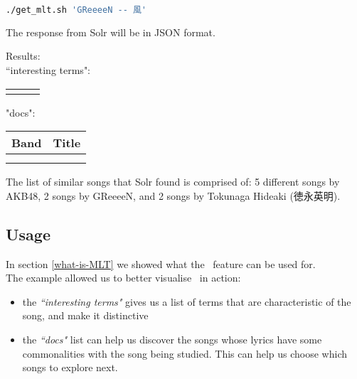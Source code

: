 \begin{lstlisting}[language=sh]
./get_mlt.sh 'GReeeeN -- 風'
\end{lstlisting}


\bigskip



The response from Solr will be in JSON format. \\



\newpage

Results: \\

``interesting terms":
\begin{longtable}{|l l l|}
	\hline
	& & \\
	\endhead
	
	\hline
	\endfoot

	
	& & \\
\end{longtable}


"docs":
\begin{longtable}{|l l|}
	\hline
	\multicolumn{1}{|c}{Band} & \multicolumn{1}{c|}{Title} \\
	\hline
	& \\
	\endhead
	
	\hline
	\endfoot
	
	
	& \\
\end{longtable}

The list of similar songs that Solr found is comprised of: 5 different songs by AKB48, 2 songs by GReeeeN, and 2 songs by Tokunaga Hideaki (徳永英明).

\newpage

\subsection{Usage}

In section \ref{what-is-MLT} we showed what the \MLT\ feature can be used for. \\

The example allowed us to better visualise \MLT\ in action:


\begin{itemize}
	\item the \emph{``interesting terms"} gives us a list of terms that are characteristic of the song, and make it distinctive
	
	\item the \emph{``docs"} list can help us discover the songs whose lyrics have some commonalities with the song being studied. This can help us choose which songs to explore next.
\end{itemize}